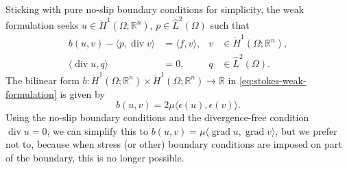 {Sticking with pure no-slip boundary conditions for simplicity, the weak formulation seeks $u\in\mathring H^1(\Omega;\mathbb R^n)$, $p\in\hat L^2(\Omega)$ such that}
\begin{equation}\label{eq:stokes-weak-formulation}
\begin{aligned}b(u,v)-\langle p,\operatorname{div}v\rangle&=\langle f,v\rangle,&v&\in\mathring H^1(\Omega;\mathbb R^n),\\\langle\operatorname{div}u,q\rangle&=0,&q&\in\hat L^2(\Omega).\end{aligned}
\end{equation}
{The bilinear form $b:\mathring H^1(\Omega;\mathbb R^n)\times\mathring H^1(\Omega;\mathbb R^n)\to\mathbb R$ in \eqref{eq:stokes-weak-formulation} is given by}
\begin{equation}\label{eq:stokes-strain-bilinear-form}
b(u,v)=2\mu\langle\epsilon(u),\epsilon(v)\rangle.
\end{equation}
{Using the no-slip boundary conditions and the divergence-free condition $\operatorname{div}u=0$, we can simplify this to $b(u,v)=\mu\langle\operatorname{grad}u,\operatorname{grad}v\rangle$, but we prefer not to, because when stress (or other) boundary conditions are imposed on part of the boundary, this is no longer possible.}

